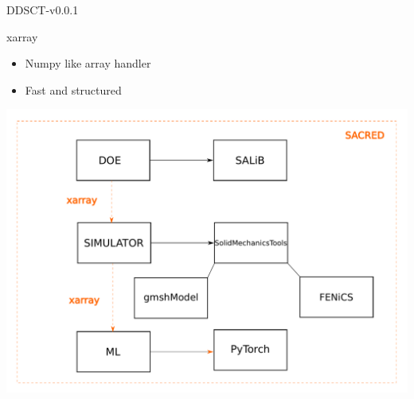 \documentclass[aspectratio=169]{beamer}
\begin{document}
\begin{frame}{DDSCT-v0.0.1}
  \begin{minipage}{0.5\textwidth}
    \begin{block}{\color{White} xarray}
  \begin{itemize}
    \item Numpy like array handler 
    \item Fast and structured
  \end{itemize}
    \end{block}
  \end{minipage}%
  \begin{minipage}{0.5\textwidth}
    \includegraphics[width=\textwidth]{Figures/DDSCT-flow.pdf}
  \end{minipage}
\end{frame}
\end{document}
